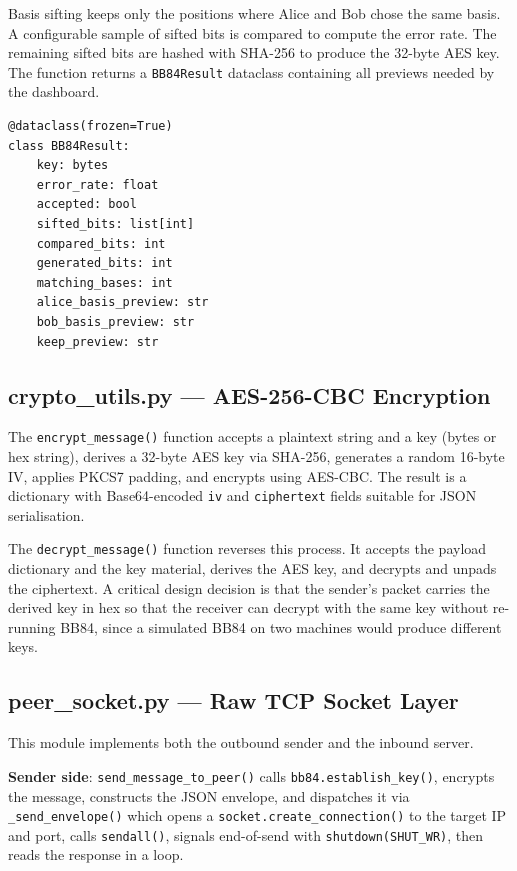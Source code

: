 Basis sifting keeps only the positions where Alice and Bob chose the same basis. A configurable sample of sifted bits is compared to compute the error rate. The remaining sifted bits are hashed with SHA-256 to produce the 32-byte AES key. The function returns a \texttt{BB84Result} dataclass containing all previews needed by the dashboard.

\begin{verbatim}
@dataclass(frozen=True)
class BB84Result:
    key: bytes
    error_rate: float
    accepted: bool
    sifted_bits: list[int]
    compared_bits: int
    generated_bits: int
    matching_bases: int
    alice_basis_preview: str
    bob_basis_preview: str
    keep_preview: str
\end{verbatim}

\subsection{crypto\_utils.py --- AES-256-CBC Encryption}

The \texttt{encrypt\_message()} function accepts a plaintext string and a key (bytes or hex string), derives a 32-byte AES key via SHA-256, generates a random 16-byte IV, applies PKCS7 padding, and encrypts using AES-CBC. The result is a dictionary with Base64-encoded \texttt{iv} and \texttt{ciphertext} fields suitable for JSON serialisation.

The \texttt{decrypt\_message()} function reverses this process. It accepts the payload dictionary and the key material, derives the AES key, and decrypts and unpads the ciphertext. A critical design decision is that the sender's packet carries the derived key in hex so that the receiver can decrypt with the same key without re-running BB84, since a simulated BB84 on two machines would produce different keys.

\subsection{peer\_socket.py --- Raw TCP Socket Layer}

This module implements both the outbound sender and the inbound server.

\textbf{Sender side}: \texttt{send\_message\_to\_peer()} calls \texttt{bb84.establish\_key()}, encrypts the message, constructs the JSON envelope, and dispatches it via \texttt{\_send\_envelope()} which opens a \texttt{socket.create\_connection()} to the target IP and port, calls \texttt{sendall()}, signals end-of-send with \texttt{shutdown(SHUT\_WR)}, then reads the response in a loop.


